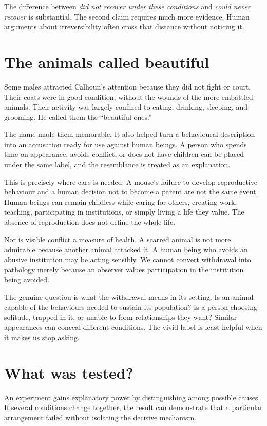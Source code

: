 \documentclass[12pt,a4paper]{book}
\begin{document}
The difference between \emph{did not recover under these conditions} and \emph{could never recover} is substantial. The second claim requires much more evidence. Human arguments about irreversibility often cross that distance without noticing it.

\section*{The animals called beautiful}

Some males attracted Calhoun's attention because they did not fight or court. Their coats were in good condition, without the wounds of the more embattled animals. Their activity was largely confined to eating, drinking, sleeping, and grooming. He called them the ``beautiful ones.''

The name made them memorable. It also helped turn a behavioural description into an accusation ready for use against human beings. A person who spends time on appearance, avoids conflict, or does not have children can be placed under the same label, and the resemblance is treated as an explanation.

This is precisely where care is needed. A mouse's failure to develop reproductive behaviour and a human decision not to become a parent are not the same event. Human beings can remain childless while caring for others, creating work, teaching, participating in institutions, or simply living a life they value. The absence of reproduction does not define the whole life.

Nor is visible conflict a measure of health. A scarred animal is not more admirable because another animal attacked it. A human being who avoids an abusive institution may be acting sensibly. We cannot convert withdrawal into pathology merely because an observer values participation in the institution being avoided.

The genuine question is what the withdrawal means in its setting. Is an animal capable of the behaviours needed to sustain its population? Is a person choosing solitude, trapped in it, or unable to form relationships they want? Similar appearances can conceal different conditions. The vivid label is least helpful when it makes us stop asking.

\section*{What was tested?}

An experiment gains explanatory power by distinguishing among possible causes. If several conditions change together, the result can demonstrate that a particular arrangement failed without isolating the decisive mechanism.
\end{document}
